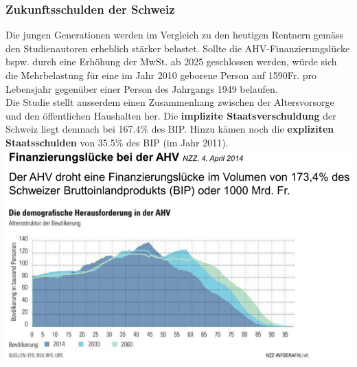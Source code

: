 \subsubsection{Zukunftsschulden der Schweiz}
\begin{multicols}{2}
	Die jungen Generationen werden im Vergleich zu den heutigen Rentnern gemäss den Studienautoren erheblich stärker belastet. Sollte die AHV-Finanzierungslücke bspw. durch eine Erhöhung der MwSt. ab 2025 geschlossen werden, würde sich die Mehrbelastung für eine im Jahr 2010 geborene Person auf 1590Fr. pro Lebensjahr gegenüber einer Person des Jahrgangs 1949 belaufen.\\
	Die Studie stellt ausserdem einen Zusammenhang zwischen der Altersvorsorge und den öffentlichen Haushalten her. Die \textbf{implizite Staatsverschuldung} der Schweiz liegt demnach bei 167.4\% des BIP. Hinzu kämen noch die \textbf{expliziten Staatsschulden} von 35.5\% des BIP (im Jahr 2011).
	\vfill\null
	\columnbreak
	\includegraphics[width=\linewidth]{images/zukunftsschulden.png}
\end{multicols}
